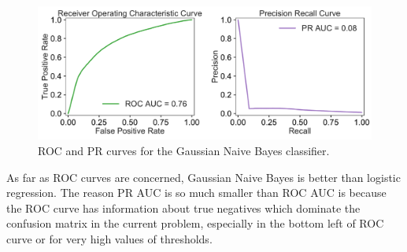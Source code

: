 \documentclass[12pt]{article}
\begin{document}
 \begin{figure}[!h]
\begin{center}
\includegraphics[width=6in]{GNB_ROC_PR_plots.pdf}
\end{center}
\caption{\label{fig:GNB}
ROC and PR curves for the Gaussian Naive Bayes classifier.}
\end{figure}
As far as ROC curves are concerned, Gaussian Naive Bayes is better than logistic regression. The reason PR AUC is so much smaller than ROC AUC is because the ROC curve has information about true negatives which dominate the confusion matrix in the current problem, especially in the bottom left of ROC curve or for very high values of thresholds. 
\end{document}
